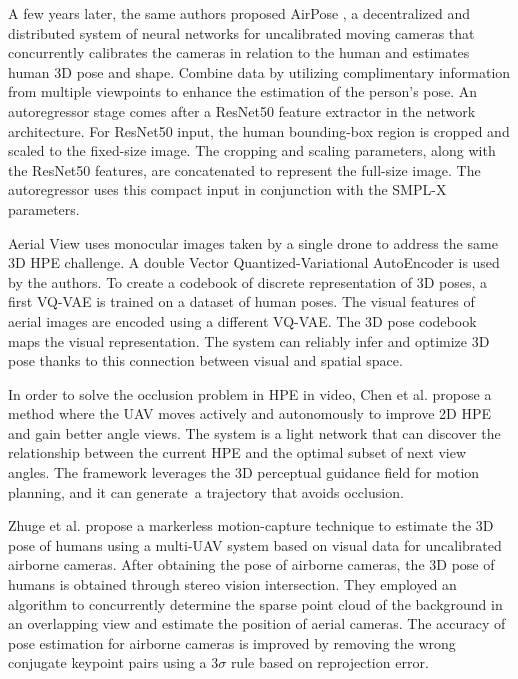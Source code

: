 A few years later, the same authors proposed AirPose \cite{saini2022airpose}, a decentralized and distributed system of neural networks for uncalibrated moving cameras that concurrently calibrates the cameras in relation to the human 
and estimates human 3D pose and shape. Combine data by utilizing complimentary information from multiple viewpoints to enhance the estimation of the person's pose. An autoregressor stage comes after a ResNet50 \cite{he2016deep} feature 
extractor in the network architecture. For ResNet50 input, the human bounding-box region is cropped and scaled to the fixed-size image. The cropping and scaling parameters, along with the ResNet50 features, are concatenated to 
represent the full-size image. The autoregressor uses this compact input in conjunction with the SMPL-X \cite{pavlakos2019expressive} parameters.

Aerial View \cite{hwang2024aerial} uses monocular images taken by a single drone to address the same 3D HPE challenge. A double Vector Quantized-Variational AutoEncoder is used by the authors. To create a codebook of discrete 
representation of 3D poses, a first VQ-VAE is trained on a dataset of human poses. The visual features of aerial images are encoded using a different VQ-VAE. The 3D pose codebook maps the visual representation. The system can 
reliably infer and optimize 3D pose thanks to this connection between visual and spatial space.
\newpage

In order to solve the occlusion problem in HPE in video, Chen et al. \cite{chen2024active} propose a method where the UAV moves actively and autonomously to improve 2D HPE and gain better angle views. The system is a light network 
that can discover the relationship between the current HPE and the optimal subset of next view angles. The framework leverages the 3D perceptual guidance field for motion planning, and it can generate a trajectory that avoids occlusion.

Zhuge et al. \cite{zhuge2023markerless} propose a markerless motion-capture technique to estimate the 3D pose of humans using a multi-UAV system based on visual data for uncalibrated airborne cameras. After obtaining the pose of 
airborne cameras, the 3D pose of humans is obtained through stereo vision intersection. They employed an algorithm to concurrently determine the sparse point cloud of the background in an overlapping view and estimate the position of 
aerial cameras. The accuracy of pose estimation for airborne cameras is improved by removing the wrong conjugate keypoint pairs using a $3\sigma$ rule based on reprojection error.